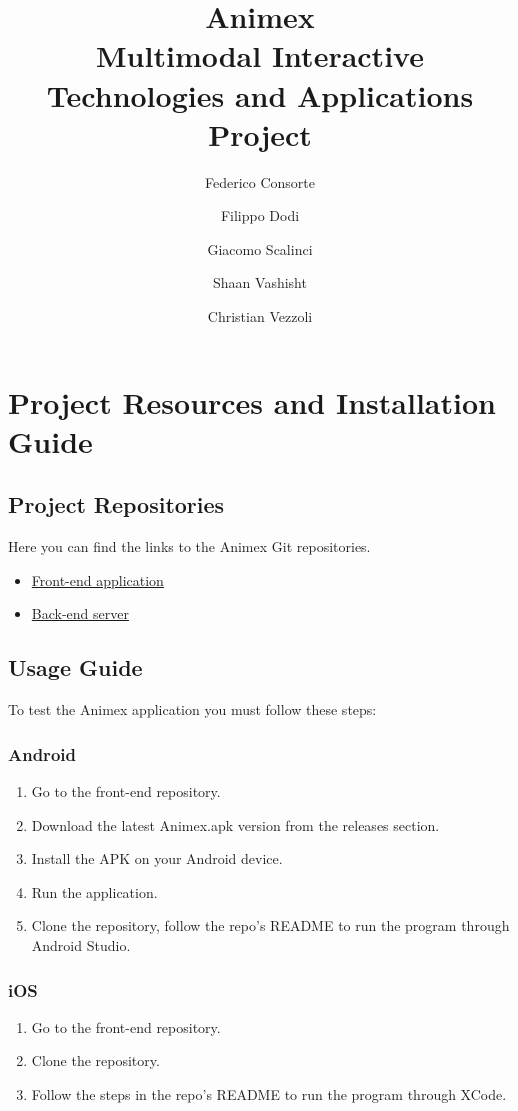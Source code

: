 \documentclass{article}
\title{Animex \\ \large Multimodal Interactive Technologies and Applications Project}
\author{
    Federico Consorte
    \and
    Filippo Dodi
    \and
    Giacomo Scalinci
    \and
    Shaan Vashisht
    \and
    Christian Vezzoli
}
\date{\vspace{-5ex}}
\begin{document}
\maketitle
\clearpage
\tableofcontents

\clearpage
\section{Project Resources and Installation Guide}
\subsection{Project Repositories}
Here you can find the links to the Animex Git repositories.
\begin{itemize}
    \item \href{https://github.com/fillododi/animex}{Front-end application}
    \item \href{https://github.com/fillododi/animex-backend}{Back-end server}
\end{itemize}
\subsection{Usage Guide}
To test the Animex application you must follow these steps:
\subsubsection{Android}
\begin{enumerate}
    \item Go to the front-end repository.
    \item Download the latest Animex.apk version from the releases section.
    \item Install the APK on your Android device.
    \item Run the application.
    \item[Fallback:] Clone the repository, follow the repo's README to run the program through Android Studio.
\end{enumerate}
\subsubsection{iOS}
\begin{enumerate}
    \item Go to the front-end repository.
    \item Clone the repository.
    \item Follow the steps in the repo's README to run the program through XCode.
\end{enumerate}
\end{document}
